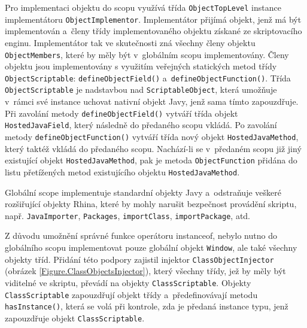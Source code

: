 Pro implementaci objektu do scopu využívá třída \texttt{ObjectTopLevel} instance implementátoru \texttt{ObjectImplementor}. Implementátor přijímá objekt, jenž má být implementován a~členy třídy implementovaného objektu získané ze skriptovacího enginu. Implementátor tak ve skutečnosti zná všechny členy objektu \texttt{ObjectMembers}, které by měly být v~globálním scopu implementovány. Členy objektu jsou implementovány s využitím veřejných statických metod třídy \texttt{ObjectScriptable}: \texttt{defineObjectField()} a~\texttt{defineObjectFunction()}. Třída \texttt{ObjectScriptable} je nadstavbou nad \texttt{ScriptableObject}, která umožňuje v~rámci své instance uchovat nativní objekt Javy, jenž sama tímto zapouzdřuje. Při zavolání metody \texttt{defineObjectField()} vytváří třída objekt \texttt{HostedJavaField}, který následně do předaného scopu vkládá. Po zavolání metody \texttt{defineObjectFunction()} vytváří třída nový objekt \texttt{HostedJavaMethod}, který taktéž vkládá do předaného scopu. Nachází-li se v~předaném scopu již jiný existující objekt \texttt{HostedJavaMethod}, pak je metoda \texttt{ObjectFunction} přidána do listu přetížených metod existujícího objektu \texttt{HostedJavaMethod}.

Globální scope implementuje standardní objekty Javy a~odstraňuje veškeré rozšiřující objekty Rhina, které by mohly narušit bezpečnost provádění skriptu, např. \texttt{JavaImporter}, \texttt{Packages}, \texttt{importClass}, \texttt{importPackage}, atd.

Z důvodu umožnění správné funkce operátoru instanceof, nebylo nutno do globálního scopu implementovat pouze globální objekt \texttt{Window}, ale také všechny objekty tříd. Přidání této podpory zajistil injektor \texttt{ClassObjectInjector} (obrázek \ref{Figure.ClassObjectsInjector}), který všechny třídy, jež by měly být viditelné ve skriptu, převádí na objekty \texttt{ClassScriptable}. Objekty \texttt{ClassScriptable} zapouzdřují objekt třídy a~předefinovávají metodu \texttt{hasInstance()}, která se volá při kontrole, zda je předaná instance typu, jenž zapouzdřuje objekt \texttt{ClassScriptable}.

